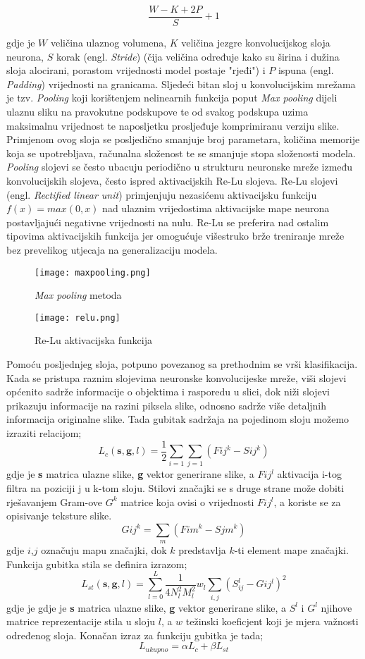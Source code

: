 \documentclass[times, utf8, diplomski]{fer}
\begin{document}
$$ \frac{W-K+2P}{S}+1 $$

gdje je $W$ veličina ulaznog volumena, $K$ veličina jezgre konvolucijskog sloja neurona, $S$ korak (engl. \textit{Stride}) (čija veličina određuje kako su širina i dužina sloja alocirani, porastom vrijednosti model postaje "rjeđi") i $P$ ispuna (engl. \textit{Padding}) vrijednosti na granicama. Sljedeći bitan sloj u konvolucijskim mrežama je tzv. \textit{Pooling} koji korištenjem nelinearnih funkcija poput \textit{Max pooling} dijeli ulaznu sliku na pravokutne podskupove te od svakog podskupa uzima maksimalnu vrijednost te naposljetku prosljeđuje komprimiranu verziju slike. Primjenom ovog sloja se posljedično smanjuje broj parametara, količina memorije koja se upotrebljava, računalna složenost te se smanjuje stopa složenosti modela. \textit{Pooling} slojevi se često ubacuju periodično u strukturu neuronske mreže između konvolucijskih slojeva, često ispred aktivacijskih Re-Lu slojeva. Re-Lu slojevi (engl. \textit{Rectified linear unit}) primjenjuju nezasićenu aktivacijsku funkciju $ f(x) = max(0,x)$ nad ulaznim vrijedostima aktivacijske mape neurona postavljajući negativne vrijednosti na nulu. Re-Lu se preferira nad ostalim tipovima aktivacijskih funkcija jer omogućuje višestruko brže treniranje mreže bez prevelikog utjecaja na generalizaciju modela.\begin{figure}
\centering
\texttt{[image: maxpooling.png]}
		\caption{\textit{Max pooling} metoda }
		\label{fig:Re-Lu aktivacijska funkcija}
\end{figure}
\begin{figure}
\centering
\texttt{[image: relu.png]}
		\caption{Re-Lu aktivacijska funkcija }
		\label{fig:Re-Lu aktivacijska funkcija}
\end{figure}
Pomoću posljednjeg sloja, potpuno povezanog sa prethodnim se vrši klasifikacija. Kada se pristupa raznim slojevima neuronske konvolucijeske mreže, viši slojevi općenito sadrže informacije o objektima i rasporedu u slici, dok niži slojevi prikazuju informacije na razini piksela slike, odnosno sadrže više detaljnih informacija originalne slike. Tada gubitak sadržaja na pojedinom sloju možemo izraziti relacijom;
$$ L_{c}(\textbf{s},\textbf{g},l) = \frac{1}{2} \sum_{i=1}\sum_{j=1}(F{ij}^k-S{ij}^k)$$
gdje je \textbf{s} matrica ulazne slike, \textbf{g} vektor generirane slike, a $F{ij}^l$ aktivacija i-tog filtra na poziciji j u k-tom sloju. Stilovi značajki se s druge strane može dobiti rješavanjem Gram-ove $ G^k$ matrice koja ovisi o vrijednosti $F{ij}^l$, a koriste se za opisivanje teksture slike.
$$ G{ij}^k = \sum_{m}(F{im}^k-S{jm}^k)$$
gdje $i$,$j$ označuju mapu značajki, dok $k$ predstavlja $k$-ti element mape značajki. Funkcija gubitka stila se definira izrazom;
$$ L_{st}(\textbf{s},\textbf{g},l) =\sum_{l=0}^L \frac{1}{4 N_l^2 M_l^2} w_l\sum_{i,j}(S_{ij}^l-G{ij}^l)^2 $$
gdje je gdje je \textbf{s} matrica ulazne slike, \textbf{g} vektor generirane slike, a $S^l$ i $G^l$ njihove matrice reprezentacije stila u sloju $l$, a $w$ težinski koeficjent koji je mjera važnosti određenog sloja. Konačan izraz za funkciju gubitka je tada;
$$ L_{ukupno} = \alpha L_{c} + \beta L_{st} $$
\end{document}
